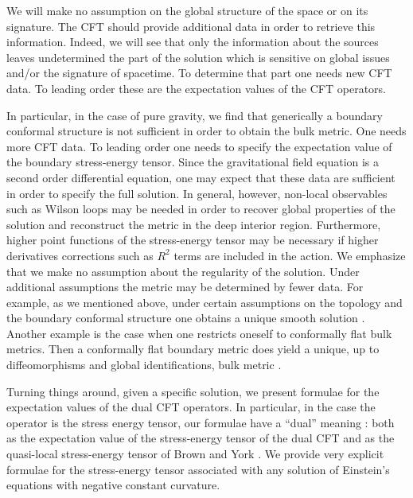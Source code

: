 We will make no assumption
on the global structure of the space or on its
signature. The CFT should provide additional 
data in order to retrieve this information.
Indeed, we will see that only the information 
about the sources leaves undetermined the 
part of the solution which is sensitive on 
global issues and/or the signature of spacetime.
To determine that part one needs new CFT data.
To leading order these are  
the expectation values of the CFT operators.

In particular, in the case of pure gravity, we find that 
generically a boundary conformal structure 
is not sufficient in order to 
obtain the bulk metric. One needs more CFT data.
To leading order one needs to specify  
the expectation value of the boundary stress-energy tensor.
Since the gravitational field equation is a second
order differential equation, one may expect that these data are sufficient 
in order to specify the full solution.
In general, however, non-local observables such as Wilson loops
may be needed in order to recover global properties of the solution and
reconstruct the metric in the deep interior region. Furthermore, 
higher point functions of the stress-energy tensor
may be necessary if higher derivatives corrections
such as $R^2$ terms are included in the action.
We emphasize that we make no assumption about the regularity 
of the solution. Under additional assumptions 
the metric may be determined by fewer data. 
For example, as we mentioned above, under certain 
assumptions on the topology and the 
boundary conformal structure one obtains 
a unique smooth solution \cite{GrahamLee}.
Another example is the case when
one restricts oneself to conformally
flat bulk metrics. Then a conformally flat boundary metric 
does yield a unique, up to diffeomorphisms and 
global identifications, bulk metric \cite{SkSo}.

Turning things around, given a specific solution,
we present formulae for the expectation values 
of the dual CFT operators. In particular, in the 
case the operator is the stress energy tensor,
our formulae have a ``dual'' meaning \cite{BK}:
both as the expectation value of the 
stress-energy tensor of the dual CFT 
and as the quasi-local stress-energy tensor 
of Brown and York \cite{BrownYork}. We provide very explicit
formulae for the stress-energy tensor associated with
any solution of Einstein's equations with 
negative constant curvature. 


